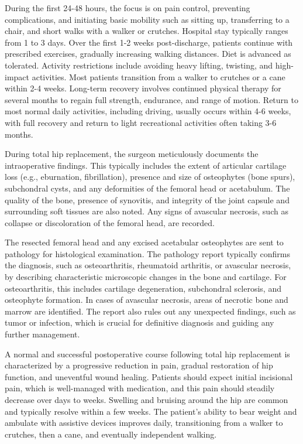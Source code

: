 During the first 24-48 hours, the focus is on pain control, preventing complications, and initiating basic mobility such as sitting up, transferring to a chair, and short walks with a walker or crutches. Hospital stay typically ranges from 1 to 3 days. Over the first 1-2 weeks post-discharge, patients continue with prescribed exercises, gradually increasing walking distances. Diet is advanced as tolerated. Activity restrictions include avoiding heavy lifting, twisting, and high-impact activities. Most patients transition from a walker to crutches or a cane within 2-4 weeks. Long-term recovery involves continued physical therapy for several months to regain full strength, endurance, and range of motion. Return to most normal daily activities, including driving, usually occurs within 4-6 weeks, with full recovery and return to light recreational activities often taking 3-6 months.

During total hip replacement, the surgeon meticulously documents the intraoperative findings. This typically includes the extent of articular cartilage loss (e.g., eburnation, fibrillation), presence and size of osteophytes (bone spurs), subchondral cysts, and any deformities of the femoral head or acetabulum. The quality of the bone, presence of synovitis, and integrity of the joint capsule and surrounding soft tissues are also noted. Any signs of avascular necrosis, such as collapse or discoloration of the femoral head, are recorded.

The resected femoral head and any excised acetabular osteophytes are sent to pathology for histological examination. The pathology report typically confirms the diagnosis, such as osteoarthritis, rheumatoid arthritis, or avascular necrosis, by describing characteristic microscopic changes in the bone and cartilage. For osteoarthritis, this includes cartilage degeneration, subchondral sclerosis, and osteophyte formation. In cases of avascular necrosis, areas of necrotic bone and marrow are identified. The report also rules out any unexpected findings, such as tumor or infection, which is crucial for definitive diagnosis and guiding any further management.

A normal and successful postoperative course following total hip replacement is characterized by a progressive reduction in pain, gradual restoration of hip function, and uneventful wound healing. Patients should expect initial incisional pain, which is well-managed with medication, and this pain should steadily decrease over days to weeks. Swelling and bruising around the hip are common and typically resolve within a few weeks. The patient's ability to bear weight and ambulate with assistive devices improves daily, transitioning from a walker to crutches, then a cane, and eventually independent walking.


